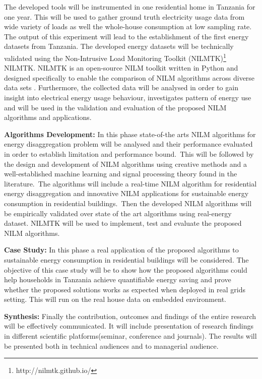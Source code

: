 The developed tools will be instrumented in one residential home in Tanzania  for one year. This will be used to gather ground truth electricity usage data from wide variety of loads as well the whole-house consumption at low sampling rate. The output of this experiment will lead to the establishment of the first energy datasets from Tanzania. The developed energy datasets will be technically validated using the Non-Intrusive Load Monitoring Toolkit (NILMTK)\footnote{http://nilmtk.github.io/} NILMTK. NILMTK is an open-source NILM toolkit written in Python and designed specifically to enable the comparison of NILM algorithms across diverse data sets \cite{Batra2014a,Kelly:2014:NVN}. Furthermore, the collected data will be analysed in order to gain insight into electrical energy usage behaviour, investigates pattern of energy use and will be used in the validation and evaluation of the proposed NILM algorithms and applications.

\textbf{Algorithms Development:} In this phase state-of-the arts NILM algorithms for energy disaggregation problem will be analysed and their performance evaluated in order to establish limitation and performance bound.~This will be followed by the design and development of NILM algorithms using creative methods and a well-established machine learning and signal processing theory found in the literature.~The algorithms will include a real-time NILM algorithm for residential energy disaggregation and innovative NILM  applications for sustainable energy consumption in residential buildings.~Then the developed NILM algorithms will be empirically validated over state of the art algorithms using real-energy dataset. NILMTK will be used to implement, test and evaluate the proposed NILM algorithms.

\textbf{Case Study:} In this phase a real application of the proposed algorithms to sustainable energy consumption in residential buildings will be considered. The objective of this case study will be to show how the proposed algorithms could help households in Tanzania achieve quantifiable energy saving and prove whether the proposed solutions works as expected when deployed in real grids setting. This will run on the real house data on embedded environment.

\textbf{Synthesis:} Finally the contribution, outcomes and findings of the entire research will be effectively communicated. It will include presentation of research findings in different scientific platforms(seminar,  conference and journals). The results will be presented both in technical audiences and to managerial audience. 